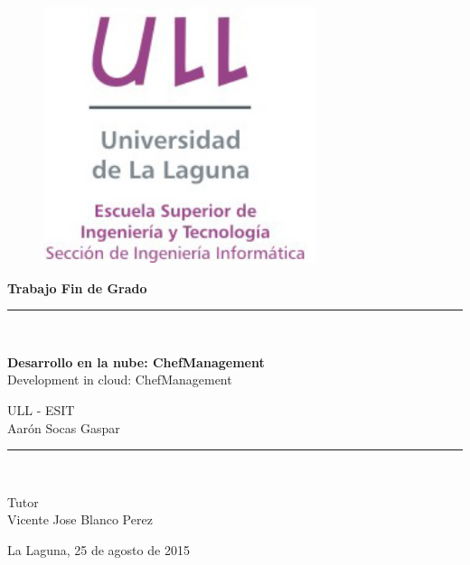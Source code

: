 \documentclass[a4paper,14pt]{book}
\begin{document}
\begin{titlepage}

	\begin{center}
		\vspace*{-1in}
		\begin{figure}[htb]
			\begin{center}
				\includegraphics[width=8cm]{./images/logotipo-secundario-ULL-ESIT.jpg}
			\end{center}
		\end{figure}

		\begin{Large}
			\textbf{{\huge Trabajo Fin de Grado}}
		\end{Large}
		\rule{80mm}{0.3mm}\\
	\end{center}

	\begin{center}
		\vspace*{0.2in}
		\begin{LARGE}
			\textbf{Desarrollo en la nube: ChefManagement} \\
			Development in cloud: ChefManagement \\
		\end{LARGE}

		\vspace*{0.2in}
		\begin{large}
			ULL - ESIT\\
			Aarón Socas Gaspar\\
		\end{large}
		\vspace*{0.3in}
		\rule{80mm}{0.1mm}\\
		
		\vspace*{0.1in}
		\begin{large}
			Tutor \\
			Vicente Jose Blanco Perez \\
		\end{large}
		\vspace*{0.3in}
		La Laguna, 25 de agosto de 2015\\
	\end{center}

\end{titlepage}

\newpage
$\ $
\thispagestyle{empty} %
\end{document}
